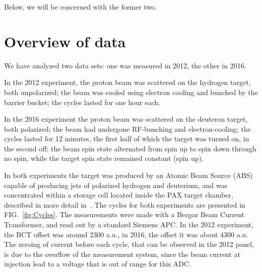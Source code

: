 \documentclass[reprint, superscriptaddress]{revtex4-1}
\begin{document}
Below, we will be concerned with the former two.

\section{Overview of data}
We have analyzed two data sets: one was measured in 2012, the other in 2016. 

In the 2012 experiment, the proton beam was scattered on the hydrogen target, both unpolarized; the beam was cooled using electron cooling and bunched by the barrier bucket; the cycles lasted for one hour each. 

In the 2016 experiment the proton beam was scattered on the deuteron target, both polarized; the beam had undergone RF-bunching and electron-cooling; the cycles lasted for 12 minutes, the first half of which the target was turned on, in the second off; the beam spin state alternated from spin up to spin down through no spin, while the target spin state remained constant (spin up). 

In both experiments the target was produced by an Atomic Beam Source (ABS) capable of producing jets of polarized hydrogen and deuterium, and was concentrated within a storage cell located inside the PAX target chamber, described in more detail in~\cite{Weidemann}. The cycles for both experiments are presented in FIG.~\ref{fig:Cycles}. The measurements were made with a Bergoz Beam Current Transformer, and read out by a standard Siemens APC. In the 2012 experiment, the BCT offset was around 2300 a.u., in 2016, the offset it was about 4300 a.u. The zeroing of current before each cycle, that can be observed in the 2012 panel, is due to the overflow of the measurement system, since the beam current at injection lead to a voltage that is out of range for this ADC.
\end{document}

